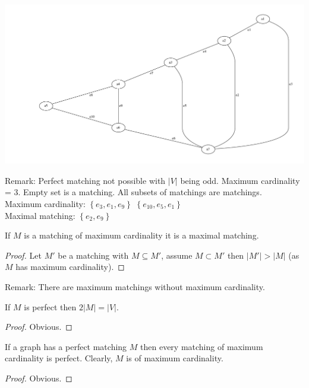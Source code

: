 \begin{example*}
\includegraphics[scale=0.35]{diagrams/Chapter4_Example1.pdf}\\
\end{example*}
Remark: Perfect matching not possible with $\lvert V \rvert$ being odd. 
Maximum cardinality = 3. Empty set is a matching. All subsets of matchings are matchings.
\\
Maximum cardinality:
$\left\{e_{3},e_{1},e_{9}\right\}$
 $\left\{e_{10},e_{5},e_{1}\right\}$\\
Maximal matching:
$\left\{e_{2},e_{9}\right\}$
\begin{lemma}
If $M$ is a matching of maximum cardinality it is a maximal matching.
\end{lemma}
\begin{proof}
Let $M'$ be a matching with $M\subseteq M'$, assume $M \subset M'$ then $\lvert M' \rvert > \lvert M \rvert $ \Lightning (as $M$ has maximum cardinality).
\end{proof}
Remark: There are maximum matchings without maximum cardinality.
\begin{lemma}
If $M$ is perfect then $2 \lvert M \rvert = \lvert V \rvert$.
\end{lemma}
\begin{proof}
Obvious.
\end{proof}
\begin{lemma}
If a graph has a perfect matching $M$ then every matching of maximum cardinality is perfect. Clearly, $M$ is
of maximum cardinality.
\end{lemma}
\begin{proof}
Obvious.
\end{proof}
